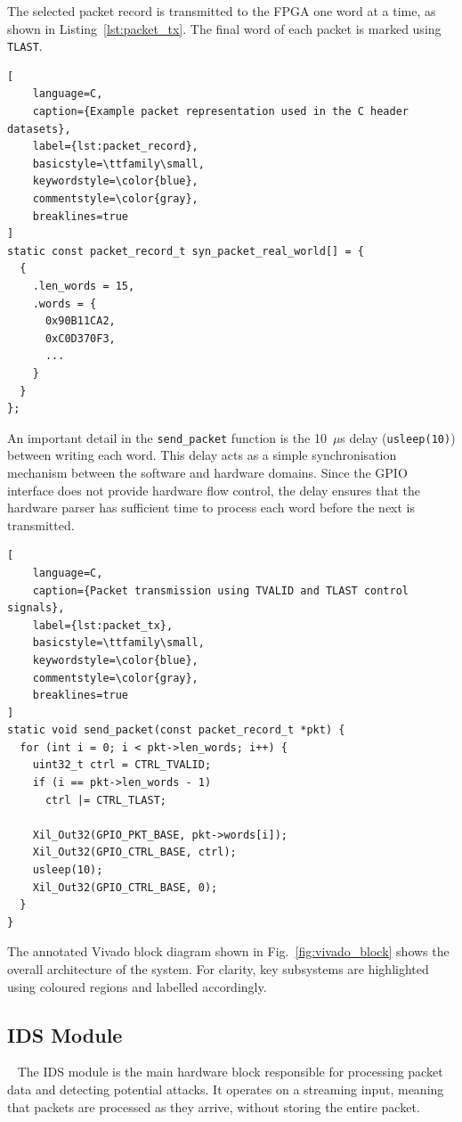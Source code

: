 The selected packet record is transmitted to the FPGA one word at a time, as
shown in Listing~\ref{lst:packet_tx}. The final word of each packet is marked
using \texttt{TLAST}.

\begin{lstlisting}[
    language=C,
    caption={Example packet representation used in the C header datasets},
    label={lst:packet_record},
    basicstyle=\ttfamily\small,
    keywordstyle=\color{blue},
    commentstyle=\color{gray},
    breaklines=true
]
static const packet_record_t syn_packet_real_world[] = {
  {
    .len_words = 15,
    .words = {
      0x90B11CA2,
      0xC0D370F3,
      ...
    }
  }
};
\end{lstlisting}

An important detail in the \texttt{send\_packet} function is the 10~$\mu$s delay
(\texttt{usleep(10)}) between writing each word. This delay acts as a simple synchronisation mechanism between the
software and hardware domains. Since the GPIO interface does not provide
hardware flow control, the delay ensures that the hardware parser has sufficient
time to process each word before the next is transmitted.

\begin{lstlisting}[
    language=C,
    caption={Packet transmission using TVALID and TLAST control signals},
    label={lst:packet_tx},
    basicstyle=\ttfamily\small,
    keywordstyle=\color{blue},
    commentstyle=\color{gray},
    breaklines=true
]
static void send_packet(const packet_record_t *pkt) {
  for (int i = 0; i < pkt->len_words; i++) {
    uint32_t ctrl = CTRL_TVALID;
    if (i == pkt->len_words - 1)
      ctrl |= CTRL_TLAST;

    Xil_Out32(GPIO_PKT_BASE, pkt->words[i]);
    Xil_Out32(GPIO_CTRL_BASE, ctrl);
    usleep(10);
    Xil_Out32(GPIO_CTRL_BASE, 0);
  }
}
\end{lstlisting}

The annotated Vivado block diagram shown in Fig.~\ref{fig:vivado_block}
shows the overall architecture of the system. For clarity, key subsystems
are highlighted using coloured regions and labelled accordingly.


\subsection{IDS Module}~\label{sec:IDS_Module}
The IDS module is the main hardware block responsible for processing packet
data and detecting potential attacks. It operates on a streaming input, meaning
that packets are processed as they arrive, without storing the entire packet.

